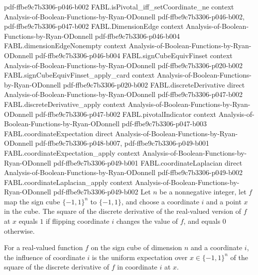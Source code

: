 \begin{theorem}
  {pdf-ffbe9c7b3306-p046-b002}
\proofstep
  {FABL.isPivotal_iff_setCoordinate_ne}
  {context}
  {Analysis-of-Boolean-Functions-by-Ryan-ODonnell}
  {pdf-ffbe9c7b3306-p046-b002,
    pdf-ffbe9c7b3306-p047-b002}
\proofstep
  {FABL.DimensionEdge}
  {context}
  {Analysis-of-Boolean-Functions-by-Ryan-ODonnell}
  {pdf-ffbe9c7b3306-p046-b004}
\proofstep
  {FABL.dimensionEdgeNonempty}
  {context}
  {Analysis-of-Boolean-Functions-by-Ryan-ODonnell}
  {pdf-ffbe9c7b3306-p046-b004}
\proofstep
  {FABL.signCubeEquivFinset}
  {context}
  {Analysis-of-Boolean-Functions-by-Ryan-ODonnell}
  {pdf-ffbe9c7b3306-p020-b002}
\proofstep
  {FABL.signCubeEquivFinset_apply_card}
  {context}
  {Analysis-of-Boolean-Functions-by-Ryan-ODonnell}
  {pdf-ffbe9c7b3306-p020-b002}
\proofstep
  {FABL.discreteDerivative}
  {direct}
  {Analysis-of-Boolean-Functions-by-Ryan-ODonnell}
  {pdf-ffbe9c7b3306-p047-b002}
\proofstep
  {FABL.discreteDerivative_apply}
  {context}
  {Analysis-of-Boolean-Functions-by-Ryan-ODonnell}
  {pdf-ffbe9c7b3306-p047-b002}
\proofstep
  {FABL.pivotalIndicator}
  {context}
  {Analysis-of-Boolean-Functions-by-Ryan-ODonnell}
  {pdf-ffbe9c7b3306-p047-b003}
\proofstep
  {FABL.coordinateExpectation}
  {direct}
  {Analysis-of-Boolean-Functions-by-Ryan-ODonnell}
  {pdf-ffbe9c7b3306-p048-b007,
    pdf-ffbe9c7b3306-p049-b001}
\proofstep
  {FABL.coordinateExpectation_apply}
  {context}
  {Analysis-of-Boolean-Functions-by-Ryan-ODonnell}
  {pdf-ffbe9c7b3306-p049-b001}
\proofstep
  {FABL.coordinateLaplacian}
  {direct}
  {Analysis-of-Boolean-Functions-by-Ryan-ODonnell}
  {pdf-ffbe9c7b3306-p049-b002}
\proofstep
  {FABL.coordinateLaplacian_apply}
  {context}
  {Analysis-of-Boolean-Functions-by-Ryan-ODonnell}
  {pdf-ffbe9c7b3306-p049-b002}
Let $n$ be a nonnegative integer, let $f$ map the sign cube $\{-1,1\}^n$ to
$\{-1,1\}$, and choose a coordinate $i$ and a point $x$ in the cube. The square of the
discrete derivative of the real-valued version of $f$ at $x$ equals $1$ if flipping
coordinate $i$ changes the value of $f$, and equals $0$ otherwise.
\end{theorem}

\begin{definition}[Influence]
\label{FABL.influence}
\leanok
{}
For a real-valued function $f$ on the sign cube of dimension $n$ and a coordinate $i$,
the influence of coordinate $i$ is the uniform expectation over $x\in\{-1,1\}^n$ of the
square of the discrete derivative of $f$ in coordinate $i$ at $x$.
\end{definition}

